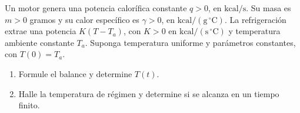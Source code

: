 Un motor genera una potencia calorífica constante $q>0$, en $\mathrm{kcal/s}$. Su masa es $m>0$ gramos y su calor específico es $\gamma>0$, en $\mathrm{kcal/(g\,{}^\circ C)}$. La refrigeración extrae una potencia $K(T-T_a)$, con $K>0$ en $\mathrm{kcal/(s\,{}^\circ C)}$ y temperatura ambiente constante $T_a$. Suponga temperatura uniforme y parámetros constantes, con $T(0)=T_a$.

\begin{enumerate}[label=(\alph*),ref=\alph*,leftmargin=*]
\item Formule el balance y determine $T(t)$.
\item Halle la temperatura de régimen y determine si se alcanza en un tiempo finito.
\end{enumerate}

